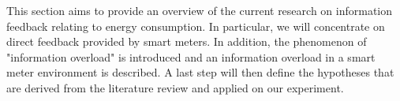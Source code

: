 %
%

% 

This section aims to provide an overview of the current research on information feedback relating to energy consumption. In particular, we will concentrate on direct feedback provided by smart meters. In addition, the phenomenon of "information overload" is introduced and an information overload in a smart meter environment is described. A last step will then define the hypotheses that are derived from the literature review and applied on our experiment.


